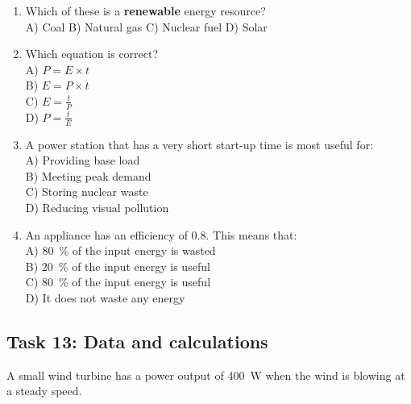 \documentclass[11pt,a4paper]{article}
\begin{document}
\begin{enumerate}[label=\arabic*)]
    \item Which of these is a \textbf{renewable} energy resource? \\
    A) Coal \hspace{0.7cm}
    B) Natural gas \hspace{0.7cm}
    C) Nuclear fuel \hspace{0.7cm}
    D) Solar

    \vspace{0.5cm}

    \item Which equation is correct? \\
    A) $P = E \times t$ \\
    B) $E = P \times t$ \\
    C) $E = \frac{t}{P}$ \\
    D) $P = \frac{t}{E}$

    \vspace{0.5cm}

    \item A power station that has a very short start-up time is most useful for: \\
    A) Providing base load \\
    B) Meeting peak demand \\
    C) Storing nuclear waste \\
    D) Reducing visual pollution

    \vspace{0.5cm}

    \item An appliance has an efficiency of 0.8. This means that: \\
    A) \SI{80}{\percent} of the input energy is wasted \\
    B) \SI{20}{\percent} of the input energy is useful \\
    C) \SI{80}{\percent} of the input energy is useful \\
    D) It does not waste any energy
\end{enumerate}

\vspace{0.5cm}
\newpage
\subsection*{Task 13: Data and calculations}

A small wind turbine has a power output of \SI{400}{\watt} when the wind is blowing at a steady speed.
\end{document}
